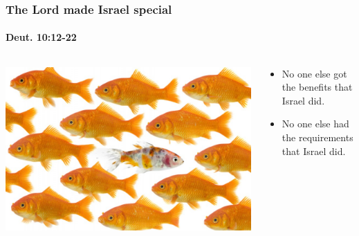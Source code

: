 \begin{frame}
\frametitle{The Lord made Israel special}
\framesubtitle{Deut. 10:12-22}
\begin{columns}[T]
\begin{column}{0.5\textwidth}
\begin{center}
\includegraphics[width=\columnwidth]{figures/uniqueFish.jpg}
\end{center}
\end{column}
\begin{column}{0.5\textwidth}
\begin{itemize}
\item No one else got the benefits that Israel did.
\item No one else had the requirements that Israel did.
\end{itemize}
\end{column}
\end{columns}

\end{frame}

